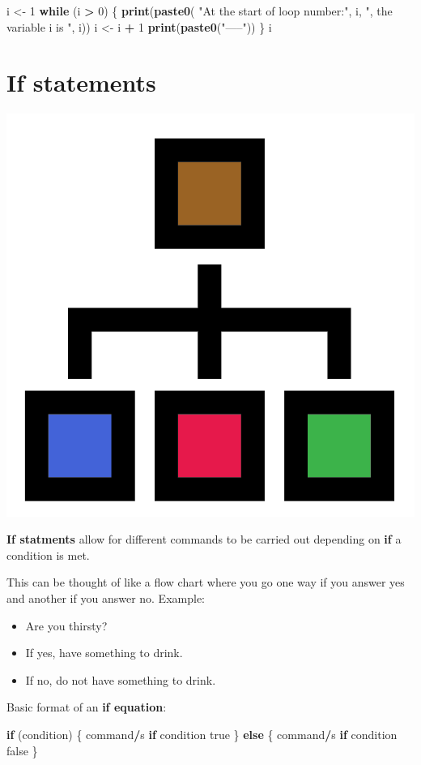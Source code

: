 \documentclass[]{book}
\newenvironment{Shaded}{\begin{snugshade}}{\end{snugshade}}
\newcommand{\KeywordTok}[1]{\textcolor[rgb]{0.13,0.29,0.53}{\textbf{#1}}}
\newcommand{\DecValTok}[1]{\textcolor[rgb]{0.00,0.00,0.81}{#1}}
\newcommand{\StringTok}[1]{\textcolor[rgb]{0.31,0.60,0.02}{#1}}
\newcommand{\ControlFlowTok}[1]{\textcolor[rgb]{0.13,0.29,0.53}{\textbf{#1}}}
\newcommand{\OperatorTok}[1]{\textcolor[rgb]{0.81,0.36,0.00}{\textbf{#1}}}
\newcommand{\NormalTok}[1]{#1}
\providecommand{\tightlist}{%
  \setlength{\itemsep}{0pt}\setlength{\parskip}{0pt}}
\begin{document}
\begin{Shaded}
\begin{Highlighting}[]
\NormalTok{i <-}\StringTok{ }\DecValTok{1}
\ControlFlowTok{while}\NormalTok{ (i }\OperatorTok{>}\StringTok{ }\DecValTok{0}\NormalTok{) \{}
  \KeywordTok{print}\NormalTok{(}\KeywordTok{paste0}\NormalTok{(}
    \StringTok{"At the start of loop number:"}\NormalTok{, i, }\StringTok{", the variable i is "}\NormalTok{, i))}
\NormalTok{  i <-}\StringTok{ }\NormalTok{i }\OperatorTok{+}\StringTok{ }\DecValTok{1}
  \KeywordTok{print}\NormalTok{(}\KeywordTok{paste0}\NormalTok{(}\StringTok{"-----"}\NormalTok{))}
\NormalTok{\}}
\NormalTok{i}
\end{Highlighting}
\end{Shaded}

\section{If statements}\label{if-statements}

\begin{center}\includegraphics[width=0.2\linewidth]{figures/flow_chart} \end{center}

\textbf{If statments} allow for different commands to be carried out
depending on \textbf{if} a condition is met.

This can be thought of like a flow chart where you go one way if you
answer yes and another if you answer no. Example:

\begin{itemize}
\tightlist
\item
  Are you thirsty?
\item
  If yes, have something to drink.
\item
  If no, do not have something to drink.
\end{itemize}

Basic format of an \textbf{if equation}:

\begin{Shaded}
\begin{Highlighting}[]
\ControlFlowTok{if}\NormalTok{ (condition) \{}
\NormalTok{  command}\OperatorTok{/}\NormalTok{s }\ControlFlowTok{if}\NormalTok{ condition true}
\NormalTok{\} }\ControlFlowTok{else}\NormalTok{ \{}
\NormalTok{  command}\OperatorTok{/}\NormalTok{s }\ControlFlowTok{if}\NormalTok{ condition false}
\NormalTok{\}}
\end{Highlighting}
\end{Shaded}
\end{document}
